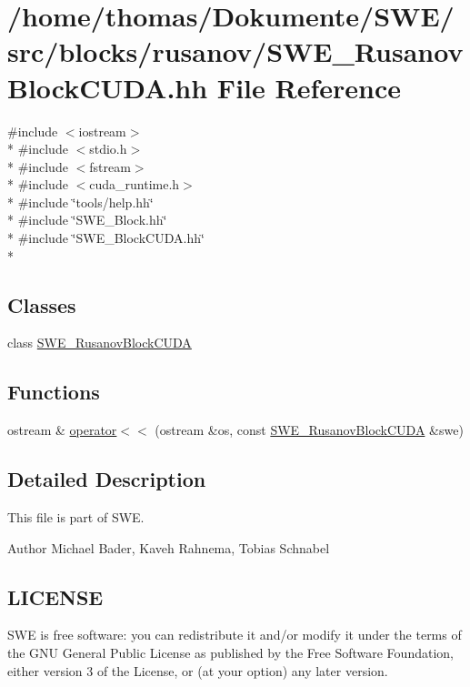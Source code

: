 \hypertarget{SWE__RusanovBlockCUDA_8hh}{\section{/home/thomas/\-Dokumente/\-S\-W\-E/src/blocks/rusanov/\-S\-W\-E\-\_\-\-Rusanov\-Block\-C\-U\-D\-A.hh File Reference}
\label{SWE__RusanovBlockCUDA_8hh}
}
{\ttfamily \#include $<$iostream$>$}\\*
{\ttfamily \#include $<$stdio.\-h$>$}\\*
{\ttfamily \#include $<$fstream$>$}\\*
{\ttfamily \#include $<$cuda\-\_\-runtime.\-h$>$}\\*
{\ttfamily \#include \char`\"{}tools/help.\-hh\char`\"{}}\\*
{\ttfamily \#include \char`\"{}S\-W\-E\-\_\-\-Block.\-hh\char`\"{}}\\*
{\ttfamily \#include \char`\"{}S\-W\-E\-\_\-\-Block\-C\-U\-D\-A.\-hh\char`\"{}}\\*
\subsection*{Classes}
\begin{DoxyCompactItemize}
\item 
class \hyperlink{classSWE__RusanovBlockCUDA}{S\-W\-E\-\_\-\-Rusanov\-Block\-C\-U\-D\-A}
\end{DoxyCompactItemize}
\subsection*{Functions}
\begin{DoxyCompactItemize}
\item 
ostream \& \hyperlink{SWE__RusanovBlockCUDA_8hh_adbdcb6417643b695657724ea16f84954}{operator$<$$<$} (ostream \&os, const \hyperlink{classSWE__RusanovBlockCUDA}{S\-W\-E\-\_\-\-Rusanov\-Block\-C\-U\-D\-A} \&swe)
\end{DoxyCompactItemize}


\subsection{Detailed Description}
This file is part of S\-W\-E.

\begin{DoxyAuthor}{Author}
Michael Bader, Kaveh Rahnema, Tobias Schnabel
\end{DoxyAuthor}
\hypertarget{Writer_8hh_LICENSE}{}\subsection{L\-I\-C\-E\-N\-S\-E}\label{Writer_8hh_LICENSE}
S\-W\-E is free software\-: you can redistribute it and/or modify it under the terms of the G\-N\-U General Public License as published by the Free Software Foundation, either version 3 of the License, or (at your option) any later version.

